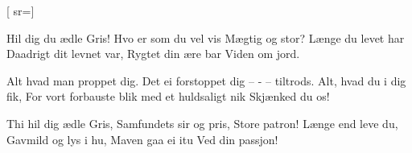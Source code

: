 
[
	sr={}]
  
\beginverse*
Hil dig du ædle Gris!
Hvo er som du vel vis
Mægtig og stor?
Længe du levet har
Daadrigt dit levnet var,
Rygtet din ære bar
Viden om jord.
\endverse

\beginverse*
Alt hvad man proppet dig.
Det ei forstoppet dig –
- – tiltrods.
Alt, hvad du i dig fik,
For vort forbauste blik
med et huldsaligt nik
Skjænked du os!
\endverse

\beginverse*
Thi hil dig ædle Gris,
Samfundets sir og pris,
Store patron!
Længe end leve du,
Gavmild og lys i hu,
Maven gaa ei itu
Ved din passjon!
\endverse

\endsong

